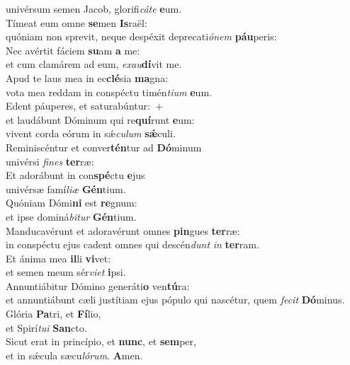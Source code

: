 \evenverse univérsum semen Jacob, glorifi\textit{cá}\textit{te} \textbf{e}um.\\
\oddverse Tímeat eum omne \textbf{se}men \textbf{Is}raël:~\*\\
\oddverse quóniam non sprevit, neque despéxit deprecati\textit{ó}\textit{nem} \textbf{páu}peris:\\
\evenverse Nec avértit fáciem \textbf{su}am \textbf{a} me:~\*\\
\evenverse et cum clamárem ad eum, \textit{e}\textit{xau}\textbf{dí}vit me.\\
\oddverse Apud te laus mea in ec\textbf{clé}sia \textbf{ma}gna:~\*\\
\oddverse vota mea reddam in conspéctu timén\textit{ti}\textit{um} \textbf{e}um.\\
\evenverse Edent páuperes, et saturabúntur:~+\\
\evenverse  et laudábunt Dóminum qui re\textbf{quí}runt \textbf{e}um:~\*\\
\evenverse vivent corda eórum in sǽ\textit{cu}\textit{lum} \textbf{sǽ}culi.\\
\oddverse Reminiscéntur et conver\textbf{tén}tur ad \textbf{Dó}minum~\*\\
\oddverse univérsi \textit{fi}\textit{nes} \textbf{ter}ræ:\\
\evenverse Et adorábunt in con\textbf{spé}ctu \textbf{e}jus~\*\\
\evenverse univérsæ famí\textit{li}\textit{æ} \textbf{Gén}tium.\\
\oddverse Quóniam Dómi\textbf{ni} est \textbf{re}gnum:~\*\\
\oddverse et ipse dominá\textit{bi}\textit{tur} \textbf{Gén}tium.\\
\evenverse Manducavérunt et adoravérunt omnes \textbf{pin}gues \textbf{ter}ræ:~\*\\
\evenverse in conspéctu ejus cadent omnes qui descén\textit{dunt} \textit{in} \textbf{ter}ram.\\
\oddverse Et ánima mea \textbf{il}li \textbf{vi}vet:~\*\\
\oddverse et semen meum sér\textit{vi}\textit{et} \textbf{i}psi.\\
\evenverse Annuntiábitur Dómino generáti\textbf{o} ven\textbf{tú}ra:~\*\\
\evenverse et annuntiábunt cæli justítiam ejus pópulo qui nascétur, quem \textit{fe}\textit{cit} \textbf{Dó}minus.\\
\oddverse Glória \textbf{Pa}tri, et \textbf{Fí}lio,~\*\\
\oddverse et Spirí\textit{tu}\textit{i} \textbf{San}cto.\\
\evenverse Sicut erat in princípio, et \textbf{nunc}, et \textbf{sem}per,~\*\\
\evenverse et in sǽcula sæcu\textit{ló}\textit{rum}. \textbf{A}men.\\
